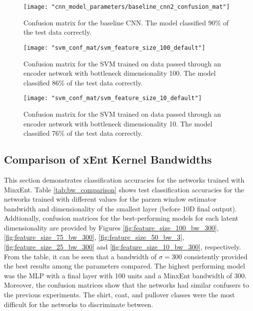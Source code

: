 \documentclass[conference]{IEEEtran}
\begin{document}
 
 \begin{center}
 	\begin{figure}[t]
 		\centering
 		\texttt{[image: "cnn\_model\_parameters/baseline\_cnn2\_confusion\_mat"]}
 		\caption{Confusion matrix for the baseline CNN.  The model classified 90\% of the test data correctly.}
 		\label{fig:conf_mat_cnn}
 	\end{figure}
 \end{center}

\begin{center}
	\begin{figure}[t]
		\centering
		\texttt{[image: "svm\_conf\_mat/svm\_feature\_size\_100\_default"]}
		\caption{Confusion matrix for the SVM trained on data passed through an encoder network with bottleneck dimensionality 100.  The model classified 86\% of the test data correctly.}
		\label{fig:conf_mat_svm_100}
	\end{figure}
\end{center}

\begin{center}
	\begin{figure}[t]
		\centering
		\texttt{[image: "svm\_conf\_mat/svm\_feature\_size\_10\_default"]}
		\caption{Confusion matrix for the SVM trained on data passed through an encoder network with bottleneck dimensionality 10.  The model classified 76\% of the test data correctly.}
		\label{fig:conf_mat_svm_10}
	\end{figure}
\end{center}
 
\subsection{Comparison of xEnt Kernel Bandwidths} \label{bw_comparison}
This section demonstrates classification accuracies for the networks trained with MinxEnt.  Table \ref{tab:bw_comparison} shows test classification accuracies for the networks trained with different values for the parzen window estimator bandwidth and dimensionality of the smallest layer (before 10D final output).  Addtionally, confusion matrices for the best-performing models for each latent dimensionality are provided by Figures \ref{fig:feature_size_100_bw_300}, \ref{fig:feature_size_75_bw_300}, \ref{fig:feature_size_50_bw_3}, \ref{fig:feature_size_25_bw_300} and \ref{fig:feature_size_10_bw_300}, respectively. From the table, it can be seen that a bandwidth of $\sigma=300$ consistently provided the best results among the parameters compared. The highest performing model was the MLP with a final layer with  100 units and a MinxEnt bandwidth of 300.  Moreover, the confusion matrices show that the networks had similar confusers to the previous experiments.  The shirt, coat, and pullover classes were the most difficult for the networks to discriminate between.
\end{document}

